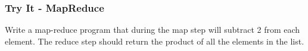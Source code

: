 \documentclass[xcolor=svgnames]{beamer}
\newcommand{\red}[1]{\textcolor{red}{#1}}
\newcommand{\ft}[1]{\frametitle{#1}}
\begin{document}
%
%
%
%
%
%
%

\begin{frame}
\ft{Try It - MapReduce}
\begin{example}
Write a map-reduce program that during the map step will subtract 2 from each element.  The reduce step should return the product of all the elements in the list.
\end{example}

\end{frame}
\end{document}
